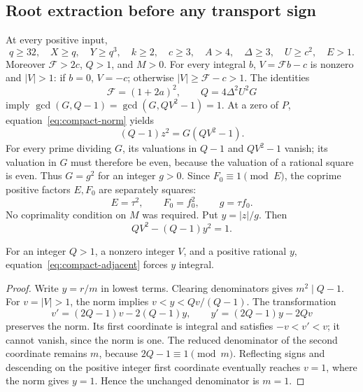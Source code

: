 \subsection{Root extraction before any transport sign}
\label{subsec:compact-roots}

At every positive input,
\[
 q\ge32,\quad X\ge q,\quad Y\ge q^3,\quad k\ge2,\quad c\ge3,
 \quad A>4,\quad\Delta\ge3,\quad U\ge c^2,\quad E>1.
\]
Moreover \(\mathcal F>2c\), \(Q>1\), and \(M>0\).
For every integral \(b\), \(V=\mathcal Fb-c\) is nonzero and
\(|V|>1\): if \(b=0\), \(V=-c\); otherwise
\(|V|\ge\mathcal F-c>1\).
The identities
\begin{equation}
 \mathcal F=(1+2a)^2,\qquad
 Q=4\Delta^2U^2G                                      \label{eq:compact-double}
\end{equation}
imply \(\gcd(G,Q-1)=\gcd(G,QV^2-1)=1\).
At a zero of \(P\), equation~\eqref{eq:compact-norm} yields
\[
 (Q-1)z^2=G(QV^2-1).
\]
For every prime dividing \(G\), its valuations in \(Q-1\) and
\(QV^2-1\) vanish; its valuation in \(G\) must therefore be even,
because the valuation of a rational square is even.  Thus \(G=g^2\)
for an integer \(g>0\).  Since \(F_0\equiv1\pmod E\), the coprime
positive factors \(E,F_0\) are separately squares:
\[
 E=\tau^2,\qquad F_0=f_0^2,\qquad g=\tau f_0.
\]
No coprimality condition on \(M\) was required.
Put \(y=|z|/g\).  Then
\begin{equation}
 QV^2-(Q-1)y^2=1.                                  \label{eq:compact-adjacent}
\end{equation}

\begin{lemma}
\label{lem:compact-adjacent}
For an integer \(Q>1\), a nonzero integer \(V\), and a positive rational
\(y\), equation~\eqref{eq:compact-adjacent} forces \(y\) integral.
\end{lemma}
\begin{proof}
Write \(y=r/m\) in lowest terms.  Clearing denominators gives
\(m^2\mid Q-1\).  For \(v=|V|>1\), the norm implies
\(v<y<Qv/(Q-1)\).  The transformation
\[
 v'=(2Q-1)v-2(Q-1)y,\qquad
 y'=(2Q-1)y-2Qv
\]
preserves the norm.  Its first coordinate is integral and satisfies
\(-v<v'<v\); it cannot vanish, since the norm is one.
The reduced denominator of the second coordinate remains \(m\), because
\(2Q-1\equiv1\pmod m\).  Reflecting signs and descending on the positive
integer first coordinate eventually reaches \(v=1\), where the norm
gives \(y=1\).  Hence the unchanged denominator is \(m=1\).
\end{proof}

